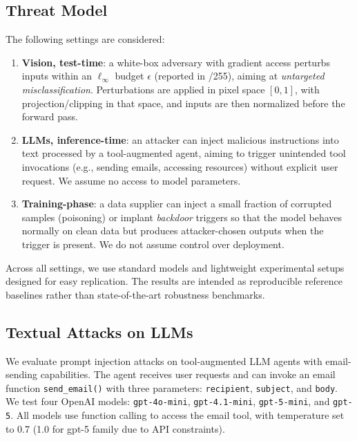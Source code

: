 \documentclass{article}
\begin{document}
\subsection{Threat Model}
The following settings are considered:
\begin{enumerate}[noitemsep, topsep=2pt, parsep=0pt, partopsep=0pt, leftmargin=*]
  \item \textbf{Vision, test-time}: a white-box adversary with gradient access perturbs inputs within an $\ell_\infty$ budget $\epsilon$ (reported in /255), aiming at \emph{untargeted misclassification}. Perturbations are applied in pixel space $[0,1]$, with projection/clipping in that space, and inputs are then normalized before the forward pass.
  \item \textbf{LLMs, inference-time}: an attacker can inject malicious instructions into text processed by a tool-augmented agent, aiming to trigger unintended tool invocations (e.g., sending emails, accessing resources) without explicit user request. We assume no access to model parameters.
  \item \textbf{Training-phase}: a data supplier can inject a small fraction of corrupted samples (poisoning) or implant \emph{backdoor} triggers so that the model behaves normally on clean data but produces attacker-chosen outputs when the trigger is present. We do not assume control over deployment.
\end{enumerate}

Across all settings, we use standard models and lightweight experimental setups designed for easy replication. The results are intended as reproducible reference baselines rather than state-of-the-art robustness benchmarks.


\subsection{Textual Attacks on LLMs}
We evaluate prompt injection attacks on tool-augmented LLM agents with email-sending capabilities. The agent receives user requests and can invoke an email function \texttt{send\_email()} with three parameters: \texttt{recipient}, \texttt{subject}, and \texttt{body}. We test four OpenAI models: \texttt{gpt-4o-mini}, \texttt{gpt-4.1-mini}, \texttt{gpt-5-mini}, and \texttt{gpt-5}. All models use function calling to access the email tool, with temperature set to 0.7 (1.0 for gpt-5 family due to API constraints).
\end{document}

